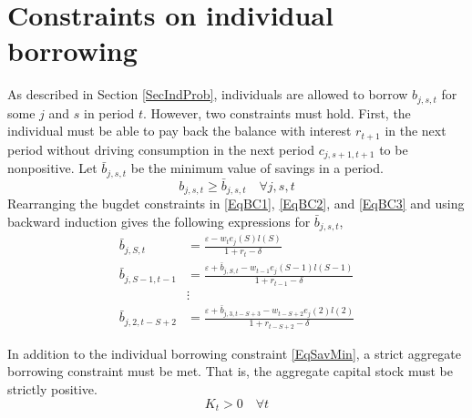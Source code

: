 \documentclass[letterpaper,12pt]{article}
\theoremstyle{definition}
\newcommand\ve{\varepsilon}
\begin{document}


\newpage
\section{Constraints on individual borrowing}\label{AppBorConstr}

  As described in Section \ref{SecIndProb}, individuals are allowed to borrow $b_{j,s,t}$ for some $j$ and $s$ in period $t$. However, two constraints must hold. First, the individual must be able to pay back the balance with interest $r_{t+1}$ in the next period without driving consumption in the next period $c_{j,s+1,t+1}$ to be nonpositive. Let $\bar{b}_{j,s,t}$ be the minimum value of savings in a period.
  \begin{equation}\label{EqSavMin}
    b_{j,s,t}\geq\bar{b}_{j,s,t} \quad\forall j,s,t
  \end{equation}
  Rearranging the bugdet constraints in \eqref{EqBC1}, \eqref{EqBC2}, and \eqref{EqBC3} and using backward induction gives the following expressions for $\bar{b}_{j,s,t}$,
  \begin{equation}\label{EqBorConsts}
    \begin{split}
      \bar{b}_{j,S,t} &= \frac{\ve - w_te_j(S)l(S)}{1+r_t-\delta}  \\
      \bar{b}_{j,S-1,t-1} &= \frac{\ve + \bar{b}_{j,S,t} - w_{t-1}e_j(S-1)l(S-1)}{1+r_{t-1}-\delta} \\
      &\vdots \\
      \bar{b}_{j,2,t-S+2} &= \frac{\ve + \bar{b}_{j,3,t-S+3} - w_{t-S+2}e_j(2)l(2)}{1+r_{t-S+2}-\delta}
    \end{split}
  \end{equation}

  In addition to the individual borrowing constraint \eqref{EqSavMin}, a strict aggregate borrowing constraint must be met. That is, the aggregate capital stock must be strictly positive.
  \begin{equation}\label{EqAggrCapConstr}
    K_t > 0 \quad\forall t
  \end{equation}



\end{document}
